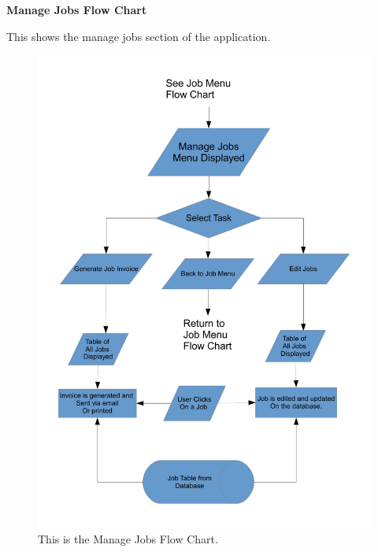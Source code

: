 \pagebreak
\textbf{Manage Jobs Flow Chart}
\begin{flushleft}
This shows the manage jobs section of the application.
\end{flushleft}
\begin{figure}[H]
\includegraphics[scale=0.5]{./Design/images/FlowChartManageJobs.pdf}
    \caption{This is the Manage Jobs Flow Chart.} 
\label{fig:FlowChartManageJobs}
\end{figure}


\pagebreak
